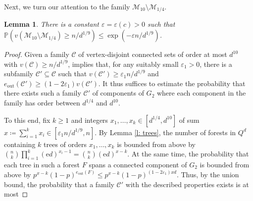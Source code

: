 \documentclass[reqno,final,a4paper]{amsart}
\newtheorem{lemma}[thm]{Lemma}
\theoremstyle{definition}
\newcommand{\cC}{\mathcal{C}}
\newcommand{\cM}{\mathcal{M}}
\def\e{\mathrm{e}}
\def\eps{\varepsilon}
\newcommand{\1}{\mathbbm{1}}
\begin{document}
Next, we turn our attention to the family $\cM_{10}\setminus \cM_{1/4}$.

\begin{lemma}\label{l: odd size}
There is a constant $\eps=\eps(c)>0$ such that
$\mathbb{P}(v(\cM_{10}\setminus \cM_{1/4})\ge n/d^{1/9})\le \exp(-\eps n/d^{1/9})$.
\end{lemma}
\begin{proof}
Given a family $\cC$ of vertex-disjoint connected sets of order at most $d^{10}$ with $v(\cC)\ge n/d^{1/9}$,   implies that, for any suitably small $\eps_1>0$, there is a subfamily $\cC'\subseteq \cC$ such that $v(\cC')\ge \eps_1 n/d^{1/9}$ and $e_{\mathrm{out}}(\cC')\ge (1-2\eps_1)v(\cC')$. 
It thus suffices to estimate the probability that there exists such a family $\cC'$ of components of $G_2$ where each component in the family has order between $d^{1/4}$ and $d^{10}$.

To this end, fix $k\ge 1$ and integers $x_1,\ldots, x_k\in [d^{1/4},d^{10}]$ of sum $x\coloneqq\sum_{i=1}^{k}x_i\in[\eps_1n/d^{1/9},n]$. 
By Lemma \ref{l: trees}, the number of forests in $Q^d$ containing $k$ trees of orders $x_1,\ldots, x_k$ is bounded from above by $\binom{n}{k} \prod_{i=1}^{k}(\e d)^{x_i-1} = \binom{n}{k}(\e d)^{x-k}$. 
At the same time, the probability that each tree in such a forest $F$ spans a connected component of $G_2$ is bounded from above by $p^{x-k}(1-p)^{e_{\mathrm{out}}(F)}\le p^{x-k}(1-p)^{(1-2\eps_1)xd}$. 
Thus, by the union bound, the probability that a family $\cC'$ with the described properties exists is at most


\end{proof}
\end{document}
